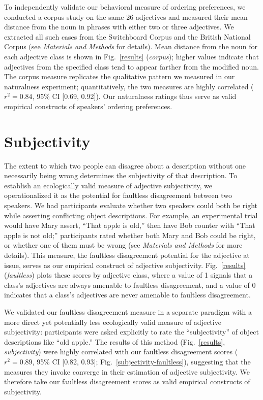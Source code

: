 \documentclass{pnastwo}
\begin{document}
\begin{article}
To independently validate our behavioral measure of ordering preferences, we conducted a corpus study on the same 26 adjectives and measured their mean distance from the noun in phrases with either two or three adjectives. We extracted all such cases from the Switchboard Corpus and the British National Corpus (see \emph{Materials and Methods} for details). Mean distance from the noun for each adjective class is shown in Fig.~\ref{results} (\emph{corpus}); higher values indicate that adjectives from the specified class tend to appear farther from the modified noun. The corpus measure replicates the qualitative pattern we measured in our naturalness experiment; quantitatively, the two measures are highly correlated ($r^{2}=0.84$, 95\% CI [0.69, 0.92]). Our naturalness ratings thus serve as valid empirical constructs of speakers' ordering preferences.

\section{Subjectivity}

The extent to which two people can disagree about a description without one necessarily being wrong determines the subjectivity of that description. To  establish an ecologically valid measure of adjective subjectivity, we operationalized it as the potential for faultless disagreement between two speakers. We had participants evaluate whether two speakers could both be right while asserting conflicting object descriptions. For example, an experimental trial would have Mary assert, ``That apple is old,'' then have Bob counter with ``That apple is not old;'' 
participants rated whether both Mary and Bob could be right, or whether one of them must be wrong (see \emph{Materials and Methods} for more details). This measure, the faultless disagreement potential for the adjective at issue, serves as our empirical construct of adjective subjectivity. Fig.\ \ref{results} (\emph{faultless}) plots these scores by adjective class, where a value of 1 signals that a class's adjectives are always amenable to faultless disagreement, and a value of 0 indicates that a class's adjectives are never amenable to faultless disagreement.

We validated our faultless disagreement measure in a separate paradigm with a more direct yet potentially less ecologically valid measure of adjective subjectivity: participants were asked explicitly to rate the ``subjectivity'' of object descriptions like ``old apple.'' The results of this method (Fig.~\ref{results}, \emph{subjectivity}) were highly correlated with our faultless disagreement scores ($r^{2} = 0.89$, 95\% CI [0.82, 0.93]; Fig.~\ref{subjectivity-faultless}), suggesting that the measures they invoke converge in their estimation of adjective subjectivity. We therefore take our faultless disagreement scores as valid empirical constructs of subjectivity.


\end{article}
\end{document}
